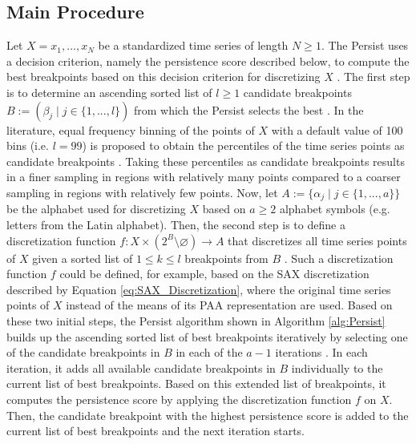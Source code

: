\subsection*{Main Procedure}
Let $X = x_1, ..., x_N$ be a standardized time series of length $N \geq 1$. The Persist uses a decision criterion, namely the persistence score described below, to compute the best breakpoints based on this decision criterion for discretizing $X$ \cite{Persist}. \newline
The first step is to determine an ascending sorted list of $l \geq 1$ candidate breakpoints $B := (\beta_j \mid j \in \{1, ..., l\})$ from which the Persist selects the best \cite{Persist}. In the literature, equal frequency binning of the points of $X$ with a default value of 100 bins (i.e. $l = 99$) is proposed to obtain the percentiles of the time series points as candidate breakpoints \cite{Persist}. Taking these percentiles as candidate breakpoints results in a finer sampling in regions with relatively many points compared to a coarser sampling in regions with relatively few points. \newline
Now, let $A := \{\alpha_j \mid j \in \{1, ..., a\}\}$ be the alphabet used for discretizing $X$ based on $a \geq 2$ alphabet symbols (e.g. letters from the Latin alphabet). Then, the second step is to define a discretization function $f: X \times (2^B \setminus \varnothing) \rightarrow A$ that discretizes all time series points of $X$ given a sorted list of $1 \leq k \leq l$ breakpoints from $B$ \cite{Persist}. Such a discretization function $f$ could be defined, for example, based on the \ac{SAX} discretization described by Equation \ref{eq:SAX_Discretization}, where the original time series points of $X$ instead of the means of its \ac{PAA} representation are used. \newline
Based on these two initial steps, the Persist algorithm shown in Algorithm \ref{alg:Persist} builds up the ascending sorted list of best breakpoints iteratively by selecting one of the candidate breakpoints in $B$ in each of the $a-1$ iterations \cite{Persist}. In each iteration, it adds all available candidate breakpoints in $B$ individually to the current list of best breakpoints. Based on this extended list of breakpoints, it computes the persistence score by applying the discretization function $f$ on $X$. Then, the candidate breakpoint with the highest persistence score is added to the current list of best breakpoints and the next iteration starts.
